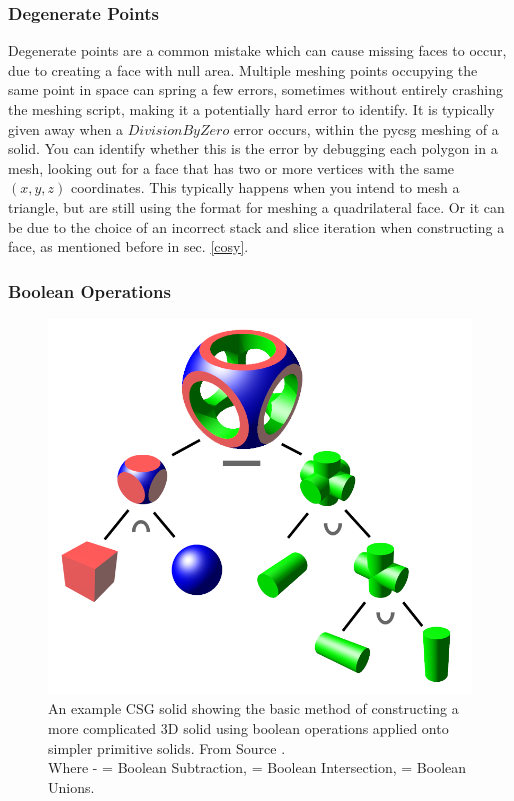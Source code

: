 \documentclass[12pt,a4paper]{article}
\begin{document}
\subsubsection{Degenerate Points}
Degenerate points are a common mistake which can cause missing faces to occur, due to creating a face with null area. Multiple meshing points occupying the same point in space can spring a few errors, sometimes without entirely crashing the meshing script, making it a potentially hard error to identify. It is typically given away when a $DivisionByZero$ error occurs, within the pycsg meshing of a solid. You can identify whether this is the error by debugging each polygon in a mesh, looking out for a face that has two or more vertices with the same $(x,y,z)$ coordinates. This typically happens when you intend to mesh a triangle, but are still using the format for meshing a quadrilateral face. Or it can be due to the choice of an incorrect stack and slice iteration when constructing a face, as mentioned before in sec. \ref{cosy}.

\newpage
\subsubsection{Boolean Operations}
\label{bool}

\begin{figure}[h!]
\centering
\includegraphics[scale=0.25]{Images//Booleans//Boolean.png}
\caption[width=\columnwidth]{An example CSG solid showing the basic method of constructing a more complicated 3D solid using boolean operations applied onto simpler primitive solids. From Source \cite{wiki}.\\
Where - = Boolean Subtraction, \cap = Boolean Intersection, \cup = Boolean Unions.}
\label{booly}
\end{figure}
\end{document}
